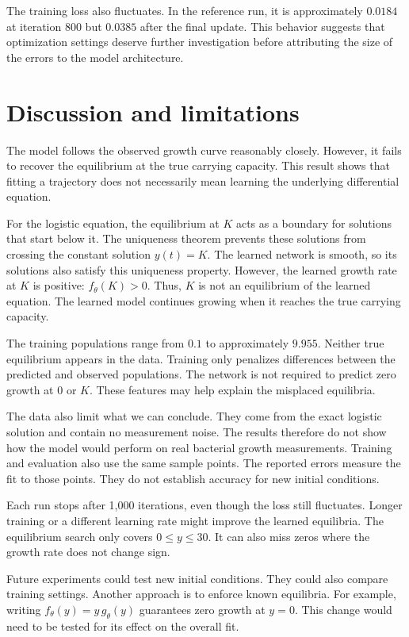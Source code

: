 \documentclass[11pt]{article}
\begin{document}
The training loss also fluctuates. In the reference run, it is approximately
$0.0184$ at iteration 800 but $0.0385$ after the final update. This behavior
suggests that optimization settings deserve further investigation before
attributing the size of the errors to the model architecture.

\section{Discussion and limitations}

The model follows the observed growth curve reasonably closely. However, it
fails to recover the equilibrium at the true carrying capacity. This result
shows that fitting a trajectory does not necessarily mean learning the
underlying differential equation.

For the logistic equation, the equilibrium at $K$ acts as a boundary for
solutions that start below it. The uniqueness
theorem prevents these solutions from crossing the constant solution
$y(t)=K$. The learned network is smooth, so its solutions also satisfy this
uniqueness property. However, the learned growth rate at $K$ is positive:
$f_\theta(K)>0$. Thus, $K$ is not an equilibrium of the learned equation.
The learned model continues growing when it reaches the true carrying capacity.

The training populations range from $0.1$ to approximately $9.955$. Neither
true equilibrium appears in the data. Training only penalizes differences
between the predicted and observed populations. The network is not required
to predict zero growth at $0$ or $K$. These features may help explain the
misplaced equilibria.

The data also limit what we can conclude. They come from the exact logistic
solution and contain no measurement noise. The results therefore do not show
how the model would perform on real bacterial growth measurements. Training
and evaluation also use the same sample points. The reported errors measure
the fit to those points. They do not establish accuracy for new initial
conditions.

Each run stops after 1,000 iterations, even though the loss still fluctuates.
Longer training or a different learning rate might improve the learned
equilibria. The equilibrium search only covers $0\le y\le30$.
It can also miss zeros where the growth rate does not change sign.

Future experiments could test new initial conditions. They could also compare
training settings. Another approach is to enforce known equilibria. For example,
writing
$f_\theta(y)=y\,g_\theta(y)$ guarantees zero growth at $y=0$. This change would
need to be tested for its effect on the overall fit.
\end{document}
